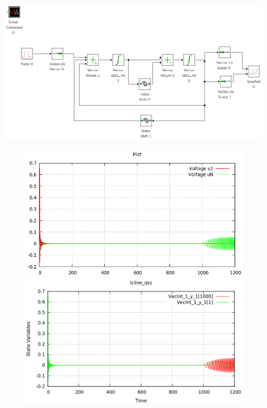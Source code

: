  \includegraphics[width=0.75\linewidth]{lclines}

\begin{figure}[H]
\centering
\begin{minipage}{0.5\textwidth}
\centering
 \includegraphics[width=\linewidth]{lcline-pd}
\end{minipage}\hfill
\begin{minipage}{0.5\textwidth}
\centering
 \includegraphics[width=\linewidth]{lcline-qss}
\end{minipage}
\end{figure}

